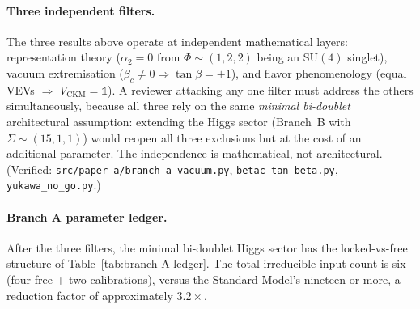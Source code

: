 \documentclass[11pt,a4paper]{article}
\theoremstyle{plain}
\theoremstyle{definition}
\theoremstyle{remark}
\begin{document}
\paragraph{Three independent filters.}
The three results above operate at independent mathematical layers:
representation theory ($\alpha_2 = 0$ from
$\Phi \sim (1, 2, 2)$ being an $\mathrm{SU}(4)$ singlet),
vacuum extremisation
($\beta_c \neq 0 \Rightarrow \tan\beta = \pm 1$),
and flavor phenomenology
(equal VEVs $\Rightarrow$ $V_{\mathrm{CKM}} = \mathbb{1}$).
A reviewer attacking any one filter must address the others
simultaneously, because all three rely on the same
\emph{minimal bi-doublet} architectural assumption: extending the
Higgs sector (Branch~B with $\Sigma \sim (15,1,1)$) would reopen
all three exclusions but at the cost of an additional parameter.
The independence is mathematical, not architectural.
(Verified: \texttt{src/paper\_a/branch\_a\_vacuum.py},
\texttt{betac\_tan\_beta.py}, \texttt{yukawa\_no\_go.py}.)

\paragraph{Branch A parameter ledger.}
After the three filters, the minimal bi-doublet Higgs sector has the
locked-vs-free structure of Table~\ref{tab:branch-A-ledger}.
The total irreducible input count is six (four free + two calibrations),
versus the Standard Model's nineteen-or-more, a reduction factor of
approximately $3.2\times$.
\end{document}
